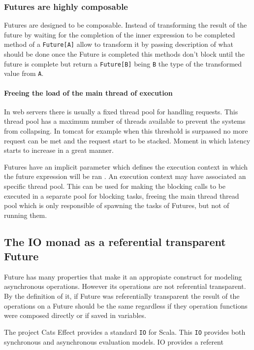 \documentclass[../main.tex]{subfiles}
\begin{document}
\subsubsection{Futures are highly composable}
Futures are designed to be composable. Instead of transforming the result of the
future by waiting for the completion of the inner expression to be completed
method of a \texttt{Future[A]} allow to transform it by passing description of what
should be done once the Future is completed this methods don't block until the
future is complete but return a \texttt{Future[B]} being \texttt{B} the type of the transformed
value from \texttt{A}.

\paragraph{Freeing the load of the main thread of execution}

In web servers there is usually a fixed thread pool for handling requests. This
thread pool has a maximum number of threads available to prevent the systems
from collapsing. In tomcat for example when this threshold is surpassed no more
request can be met and the request start to be stacked. Moment in which latency
starts to increase in a great manner.

Futures have an implicit parameter which defines the execution context in which
the future expression will be ran \autocite{ScalaScala.concurrent.ExecutionContext}. An
execution context may have associated an specific thread pool. This can be used
for making the blocking calls to be executed in a separate pool for blocking
tasks, freeing the main thread thread pool which is only responsible of spawning the tasks
of Futures, but not of running them.

\subsection{The IO monad as a referential transparent Future}
Future has many properties that make it an appropiate construct for modeling
asynchronous operations. However its operations are not referential transparent.
By the definition of it, if Future was referentially transparent the result of the operations on a
Future should be the same regardless if they operation functions were composed
directly or if saved in variables.

The project Cats Effect \autocite{CatsHome} provides a standard \texttt{IO} for
Scala. This \texttt{IO} provides both synchronous and asynchronous evaluation
models. IO provides a referent
\end{document}
